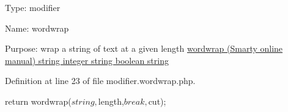 \-Type\-: modifier\par
 \-Name\-: wordwrap\par
 \-Purpose\-: wrap a string of text at a given length \hyperlink{}{wordwrap (\-Smarty online manual)  string  integer  string  boolean  string }

\-Definition at line 23 of file modifier.\-wordwrap.\-php.


\begin{DoxyCode}
{
        return wordwrap($string,$length,$break,$cut);
}
\end{DoxyCode}
